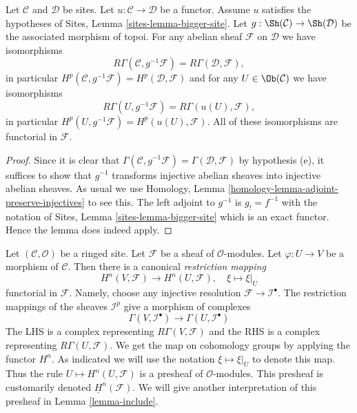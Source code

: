 \begin{lemma}
\label{lemma-cohomology-bigger-site}
Let $\mathcal{C}$ and $\mathcal{D}$ be sites.
Let $u : \mathcal{C} \to \mathcal{D}$ be a functor.
Assume $u$ satisfies the hypotheses of
Sites, Lemma \ref{sites-lemma-bigger-site}.
Let $g : \Sh(\mathcal{C}) \to \Sh(\mathcal{D})$
be the associated morphism of topoi.
For any abelian sheaf $\mathcal{F}$ on $\mathcal{D}$ we have
isomorphisms
$$
R\Gamma(\mathcal{C}, g^{-1}\mathcal{F}) = R\Gamma(\mathcal{D}, \mathcal{F}),
$$
in particular
$H^p(\mathcal{C}, g^{-1}\mathcal{F}) = H^p(\mathcal{D}, \mathcal{F})$
and for any $U \in \Ob(\mathcal{C})$ we have isomorphisms
$$
R\Gamma(U, g^{-1}\mathcal{F}) = R\Gamma(u(U), \mathcal{F}),
$$
in particular
$H^p(U, g^{-1}\mathcal{F}) = H^p(u(U), \mathcal{F})$. All of these
isomorphisms are functorial in $\mathcal{F}$.
\end{lemma}

\begin{proof}
Since it is clear that
$\Gamma(\mathcal{C}, g^{-1}\mathcal{F}) = \Gamma(\mathcal{D}, \mathcal{F})$
by hypothesis (e), it suffices to show that $g^{-1}$ transforms injective
abelian sheaves into injective abelian sheaves. As usual we use
Homology, Lemma \ref{homology-lemma-adjoint-preserve-injectives}
to see this. The left adjoint to $g^{-1}$ is $g_! = f^{-1}$ with the
notation of
Sites, Lemma \ref{sites-lemma-bigger-site}
which is an exact functor. Hence the lemma does indeed apply.
\end{proof}

\noindent
Let $(\mathcal{C}, \mathcal{O})$ be a ringed site.
Let $\mathcal{F}$ be a sheaf of $\mathcal{O}$-modules.
Let $\varphi : U \to V$ be a morphism of $\mathcal{C}$.
Then there is a canonical {\it restriction mapping}
\begin{equation}
\label{equation-restriction-mapping}
H^n(V, \mathcal{F})
\longrightarrow
H^n(U, \mathcal{F}), \quad
\xi \longmapsto \xi|_U
\end{equation}
functorial in $\mathcal{F}$. Namely, choose any injective
resolution $\mathcal{F} \to \mathcal{I}^\bullet$. The restriction
mappings of the sheaves $\mathcal{I}^p$ give a morphism of complexes
$$
\Gamma(V, \mathcal{I}^\bullet)
\longrightarrow
\Gamma(U, \mathcal{I}^\bullet)
$$
The LHS is a complex representing $R\Gamma(V, \mathcal{F})$
and the RHS is a complex representing $R\Gamma(U, \mathcal{F})$.
We get the map on cohomology groups by applying the functor $H^n$.
As indicated we will use the notation $\xi \mapsto \xi|_U$ to denote this map.
Thus the rule $U \mapsto H^n(U, \mathcal{F})$ is a presheaf of
$\mathcal{O}$-modules. This presheaf is customarily denoted
$\underline{H}^n(\mathcal{F})$. We will give another interpretation
of this presheaf in Lemma \ref{lemma-include}.


